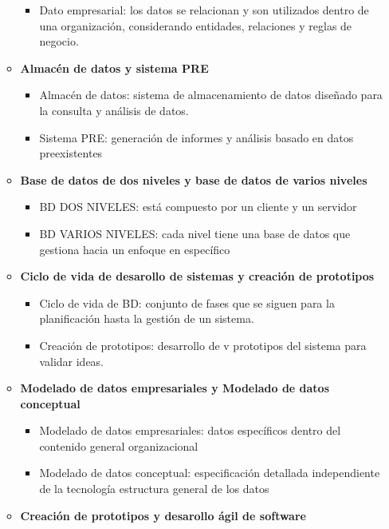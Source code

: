\documentclass[letterpaper,12pt]{article}
\begin{document}
\begin{sloppypar}
\begin{itemize}
\begin{itemize}
\begin{itemize}
            \item Dato empresarial: los datos se relacionan y son utilizados dentro de una organización, considerando entidades, relaciones y reglas de negocio.
        \end{itemize}
        \item \textbf{Almacén de datos y sistema PRE}
        \begin{itemize}
            \item Almacén de datos: sistema de almacenamiento de datos diseñado para la consulta y análisis de datos.
            \item Sistema PRE: generación de informes y análisis basado en datos preexistentes
        \end{itemize}
        \item \textbf{Base de datos de dos niveles y base de datos de varios niveles}
        \begin{itemize}
            \item BD DOS NIVELES: está compuesto por un cliente y un servidor
            \item BD VARIOS NIVELES: cada nivel tiene una base de datos que gestiona hacia un enfoque en específico
        \end{itemize}
        \item \textbf{Ciclo de vida de desarollo de sistemas y creación de prototipos}
        \begin{itemize}
            \item Ciclo de vida de BD: conjunto de fases que se siguen para la planificación hasta la gestión de un sistema.
            \item Creación de prototipos: desarrollo de v prototipos del sistema para validar ideas.
        \end{itemize}
        \item \textbf{Modelado de datos empresariales y Modelado de datos conceptual}
        \begin{itemize}
            \item Modelado de datos empresariales: datos específicos dentro del contenido general organizacional
            \item Modelado de datos conceptual: especificación detallada independiente de la tecnología estructura general de los datos
        \end{itemize}
        \item \textbf{Creación de prototipos y desarollo ágil de software}
        \begin{itemize}

\end{itemize}
\end{itemize}
\end{itemize}
\end{sloppypar}
\end{document}
